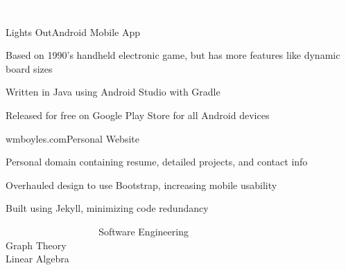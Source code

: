 \documentclass{resume}
\begin{document}
\begin{rSection}{\colorbox{NCSURED}{\textcolor{WHITE}{Projects}}}
	\begin{rSubsection}{Lights Out}{Android Mobile App}{}{}
		\item Based on 1990's handheld electronic game, but has more features like dynamic board sizes
		\item Written in Java using Android Studio with Gradle
		\item Released for free on Google Play Store for all Android devices
	\end{rSubsection}
	
	\begin{rSubsection}{wmboyles.com}{Personal Website}{}{}
		\item Personal domain containing resume, detailed projects, and contact info
		\item Overhauled design to use Bootstrap, increasing mobile usability
		\item Built using Jekyll, minimizing code redundancy
	\end{rSubsection}	
\end{rSection}

\begin{rSection}{\colorbox{NCSURED}{\textcolor{WHITE}{Relevant Coursework}}}
	{Software Engineering}
	 \\
	{Graph Theory}
	 \\
	{ Linear Algebra}
\end{rSection}
\end{document}
